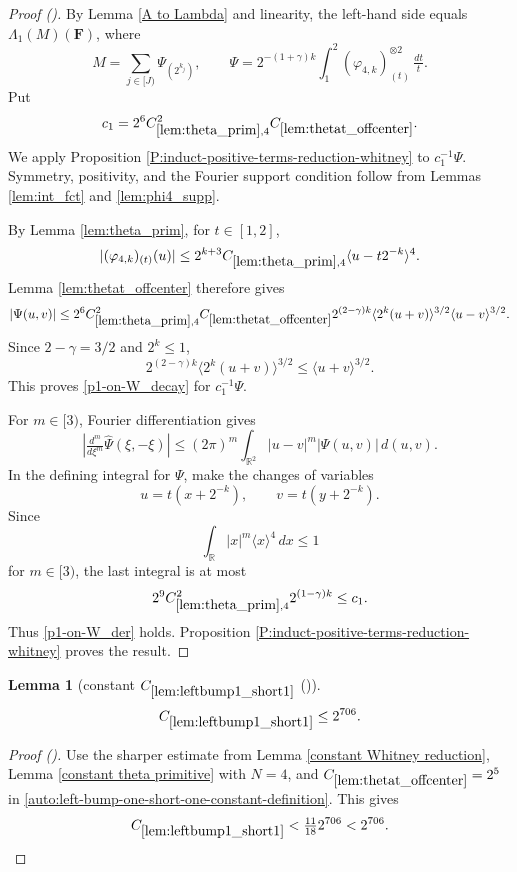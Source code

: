 \documentclass[12pt,reqno]{amsart}
\newcommand{\auto}{{({\tiny\faCar})}}
\theoremstyle{plain}
\newtheorem{lemma}[theorem]{Lemma}
\numberwithin{equation}{section}
\theoremstyle{remark}
\newcommand{\using}[1]{}
\newcommand{\R}{{\mathbb R}}
\newcommand{\F}{\mathbf{F}}
\begin{document}
\begin{proof}[Proof \auto]
By Lemma \ref{A to Lambda} and linearity, the left-hand side equals $\Lambda_1(M)(\F)$, where
\[
M=\sum_{j\in[J)}\Psi_{(2^{k_j})},
\qquad
\Psi=2^{-(1+\gamma)k}\int_1^2(\varphi_{4,k})_{(t)}^{\otimes2}\,\tfrac{dt}{t}.
\]
Put
\[
c_1=2^6C_{\ref{lem:theta_prim},4}^2C_{\ref{lem:thetat_offcenter}}.
\]
We apply Proposition \ref{P:induct-positive-terms-reduction-whitney} to $c_1^{-1}\Psi$. Symmetry, positivity, and the Fourier support condition follow from Lemmas \ref{lem:int_fct} and \ref{lem:phi4_supp}.

By Lemma \ref{lem:theta_prim}, for $t\in[1,2]$,
\[
|(\varphi_{4,k})_{(t)}(u)|
\le2^{k+3}C_{\ref{lem:theta_prim},4}
\langle u-t2^{-k}\rangle^4.
\]
Lemma \ref{lem:thetat_offcenter} therefore gives
\[
|\Psi(u,v)|
\le2^6C_{\ref{lem:theta_prim},4}^2C_{\ref{lem:thetat_offcenter}}
2^{(2-\gamma)k}
\langle2^k(u+v)\rangle^{3/2}
\langle u-v\rangle^{3/2}.
\]
Since $2-\gamma=3/2$ and $2^k\le1$,
\[
2^{(2-\gamma)k}\langle2^k(u+v)\rangle^{3/2}
\le\langle u+v\rangle^{3/2}.
\]
This proves \eqref{p1-on-W_decay} for $c_1^{-1}\Psi$.

For $m\in[3)$, Fourier differentiation gives
\[
\left|\tfrac{d^m}{d\xi^m}\widehat\Psi(\xi,-\xi)\right|
\le(2\pi)^m\int_{\R^2}|u-v|^m|\Psi(u,v)|\,d(u,v).
\]
In the defining integral for $\Psi$, make the changes of variables
\[
u=t(x+2^{-k}),
\qquad
v=t(y+2^{-k}).
\]
Since
\[
\int_\R |x|^m\langle x\rangle^4\,dx\le1
\]
for $m\in[3)$, the last integral is at most
\[
2^9C_{\ref{lem:theta_prim},4}^2 2^{(1-\gamma)k}
\le c_1.
\]
Thus \eqref{p1-on-W_der} holds. Proposition \ref{P:induct-positive-terms-reduction-whitney} proves the result.
\end{proof}

\begin{lemma}[constant $C_{\ref{lem:leftbump1_short1}}$ \auto]\label{constant left bump one short one}\using{constant Whitney reduction}\using{constant theta primitive}\using{lem:thetat_offcenter}\using{lem:leftbump1_short1}
\begin{equation}\label{constant left bump one short one bound}
C_{\ref{lem:leftbump1_short1}}\le2^{706}.
\end{equation}
\end{lemma}
\begin{proof}[Proof \auto]
Use the sharper estimate from Lemma \ref{constant Whitney reduction}, Lemma \ref{constant theta primitive} with $N=4$, and $C_{\ref{lem:thetat_offcenter}}=2^5$ in \eqref{auto:left-bump-one-short-one-constant-definition}. This gives
\[
C_{\ref{lem:leftbump1_short1}}<\tfrac{11}{18}2^{706}<2^{706}.
\]
\end{proof}
\end{document}
